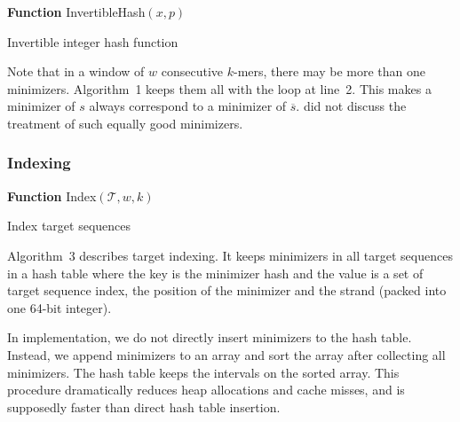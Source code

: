 \documentclass{bioinfo}
\begin{document}
\begin{methods}
\begin{algorithm}[ht]
\DontPrintSemicolon
\footnotesize
{}
\BlankLine
\textbf{Function} {\sc InvertibleHash}$(x,p)$
\caption{Invertible integer hash function}
\end{algorithm}

Note that in a window of $w$ consecutive $k$-mers, there may be more than one
minimizers. Algorithm~1 keeps them all with the loop at line~2. This makes a
minimizer of $s$ always correspond to a minimizer of $\overline{s}$.
\citet{Roberts:2004fv} did not discuss the treatment of such equally good
minimizers.

\subsubsection{Indexing}

\begin{algorithm}[ht]
\DontPrintSemicolon
\footnotesize
{}
\BlankLine
\textbf{Function} {\sc Index}$(\mathcal{T},w,k)$
\caption{Index target sequences}
\end{algorithm}

Algorithm~3 describes target indexing. It keeps minimizers in all target
sequences in a hash table where the key is the minimizer hash and the value is
a set of target sequence index, the position of the minimizer and the strand
(packed into one 64-bit integer).

In implementation, we do not directly insert minimizers to the hash table.
Instead, we append minimizers to an array and sort the array after collecting
all minimizers. The hash table keeps the intervals on the sorted array. This
procedure dramatically reduces heap allocations and cache misses, and is
supposedly faster than direct hash table insertion.


\end{methods}
\end{document}
